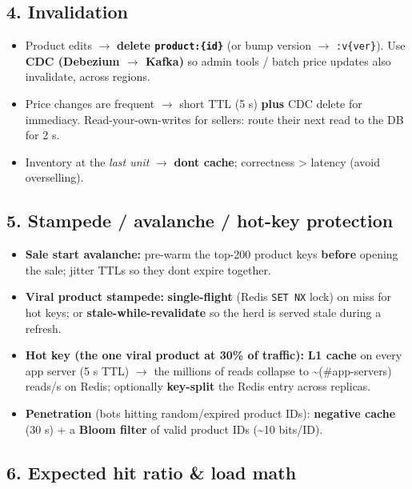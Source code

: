 \documentclass[11pt]{article}
\providecommand{\tightlist}{\setlength{\itemsep}{1pt}\setlength{\parskip}{0pt}}
\begin{document}
\subsection{4. Invalidation}\label{4-invalidation}

\begin{itemize}
\tightlist
\item
  Product edits \(\rightarrow\) \textbf{delete \texttt{product:\{id\}}} (or bump version \(\rightarrow\) \texttt{:v\{ver\}}). Use \textbf{CDC (Debezium \(\rightarrow\) Kafka)} so admin tools / batch price updates also invalidate, across regions.
\item
  Price changes are frequent \(\rightarrow\) short TTL (5 s) \textbf{plus} CDC delete for immediacy. Read-your-own-writes for sellers: route their next read to the DB for 2 s.
\item
  Inventory at the \emph{last unit} \(\rightarrow\) \textbf{don\textquotesingle t cache}; correctness \textgreater{} latency (avoid overselling).
\end{itemize}

\subsection{5. Stampede / avalanche / hot-key protection}\label{5-stampede--avalanche--hot-key-protection}

\begin{itemize}
\tightlist
\item
  \textbf{Sale start avalanche:} pre-warm the top-200 product keys \textbf{before} opening the sale; jitter TTLs so they don\textquotesingle t expire together.
\item
  \textbf{Viral product stampede:} \textbf{single-flight} (Redis \texttt{SET\ NX} lock) on miss for hot keys; or \textbf{stale-while-revalidate} so the herd is served stale during a refresh.
\item
  \textbf{Hot key (the one viral product at 30\% of traffic):} \textbf{L1 cache} on every app server (5 s TTL) \(\rightarrow\) the millions of reads collapse to \textasciitilde(\#app-servers) reads/s on Redis; optionally \textbf{key-split} the Redis entry across replicas.
\item
  \textbf{Penetration} (bots hitting random/expired product IDs): \textbf{negative cache} (30 s) + a \textbf{Bloom filter} of valid product IDs (\textasciitilde10 bits/ID).
\end{itemize}

\subsection{6. Expected hit ratio \& load math}\label{6-expected-hit-ratio--load-math}
\end{document}
